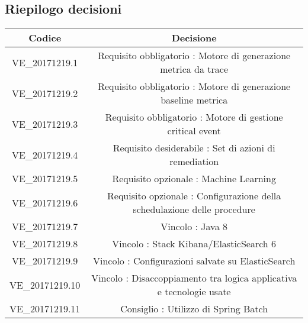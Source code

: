 \subsection{Riepilogo decisioni}
\begin{center}
    \begin{tabular}{c | c}
        \centering
        \rowcolor[gray]{.9} { \textbf{Codice} } & { \textbf{Decisione} } \\ 
        \hline
        \rowcolor[gray]{.8} VE\_20171219.1 & Requisito obbligatorio : Motore di generazione metrica da trace \\
        \rowcolor[gray]{.9} VE\_20171219.2 & Requisito obbligatorio : Motore di generazione baseline metrica \\
        \rowcolor[gray]{.8} VE\_20171219.3 & Requisito obbligatorio : Motore di gestione critical event \\
        \rowcolor[gray]{.9} VE\_20171219.4 & Requisito desiderabile : Set di azioni di remediation \\
        \rowcolor[gray]{.8} VE\_20171219.5 & Requisito opzionale : Machine Learning \\
        \rowcolor[gray]{.9} VE\_20171219.6 & Requisito opzionale : Configurazione della schedulazione delle procedure \\
        \rowcolor[gray]{.8} VE\_20171219.7 & Vincolo : Java 8 \\
        \rowcolor[gray]{.9} VE\_20171219.8 & Vincolo : Stack Kibana/ElasticSearch 6 \\
        \rowcolor[gray]{.8} VE\_20171219.9 & Vincolo : Configurazioni salvate su ElasticSearch \\
        \rowcolor[gray]{.9} VE\_20171219.10 & Vincolo : Disaccoppiamento tra logica applicativa e tecnologie usate \\
        \rowcolor[gray]{.8} VE\_20171219.11 & Consiglio : Utilizzo di Spring Batch \\
    \end{tabular}
\end{center}
